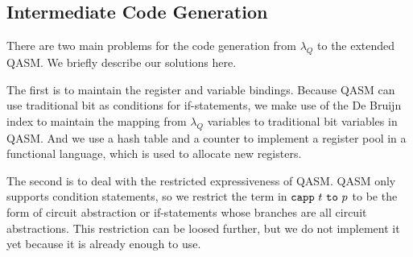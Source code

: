\subsection{Intermediate Code Generation}
There are two main problems for the code generation from $\lambda_Q$ to the extended QASM. We briefly describe our solutions here.

The first is to maintain the register and variable bindings.
Because QASM can use traditional bit as conditions for if-statements, we make use of the De Bruijn index to maintain the mapping from $\lambda_Q$ variables to traditional bit variables in QASM.
And we use a hash table and a counter to implement a register pool in a functional language, which is used to allocate new registers.

The second is to deal with the restricted expressiveness of QASM.
QASM only supports condition statements, so we restrict the term in $\mathtt{capp}\ t\ \mathtt{to}\ p$ to be the form of circuit abstraction or if-statements whose branches are all circuit abstractions.
This restriction can be loosed further, but we do not implement it yet because it is already enough to use.